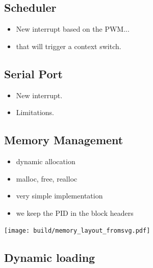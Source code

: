 \documentclass{beamer}
\begin{document}
    \subsection{Scheduler}

    \begin{frame}
      \begin{itemize}
        \item New interrupt based on the PWM...
        \item that will trigger a context switch.
      \end{itemize}
    \end{frame}

    \subsection{Serial Port}

    \begin{frame}
      \begin{itemize}
        \item New interrupt.
        \item Limitations.
      \end{itemize}
    \end{frame}

    \subsection{Memory Management}
    
    \begin{frame}
      \begin{itemize}
        \item dynamic allocation
        \item malloc, free, realloc
        \item very simple implementation
        \item we keep the PID in the block headers
      \end{itemize}
    \end{frame}

    \begin{frame}
        \begin{center}
        \texttt{[image: build/memory\_layout\_fromsvg.pdf]}
        \end{center}
    \end{frame}


    \subsection{Dynamic loading}
 
\end{document}
